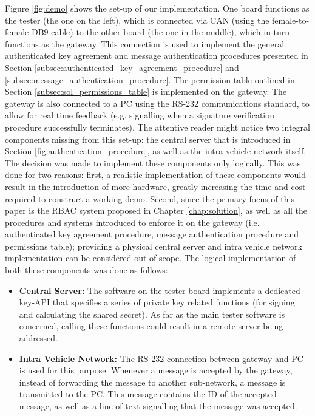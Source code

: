 Figure \ref{fig:demo} shows the set-up of our implementation. One board functions as the tester (the one on the left), which is connected via CAN (using the female-to-female DB9 cable) to the other board (the one in the middle), which in turn functions as the gateway. This connection is used to implement the general authenticated key agreement and message authentication procedures presented in Section \ref{subsec:authenticated_key_agreement_procedure} and \ref{subsec:message_authentication_procedure}. The permission table outlined in Section \ref{subsec:sol_permissions_table} is implemented on the gateway. The gateway is also connected to a PC using the RS-232 communications standard, to allow for real time feedback (e.g. signalling when a signature verification procedure successfully terminates). The attentive reader might notice two integral components missing from this set-up: the central server that is introduced in Section \ref{fig:authentication_procedure}, as well as the intra vehicle network itself. The decision was made to implement these components only logically. This was done for two reasons: first, a realistic implementation of these components would result in the introduction of more hardware, greatly increasing the time and cost required to construct a working demo. Second, since the primary focus of this paper is the RBAC system proposed in Chapter \ref{chap:solution}, as well as all the procedures and systems introduced to enforce it on the gateway (i.e. authenticated key agreement procedure, message authentication procedure and permissions table); providing a physical central server and intra vehicle network implementation can be considered out of scope. The logical implementation of both these components was done as follows:
\begin{itemize}
	\item \textbf{Central Server:} The software on the tester board implements a dedicated key-API that specifies a series of private key related functions (for signing and calculating the shared secret). As far as the main tester software is concerned, calling these functions could result in a remote server being addressed.
	
	\item \textbf{Intra Vehicle Network:} The RS-232 connection between gateway and PC is used for this purpose. Whenever a message is accepted by the gateway, instead of forwarding the message to another sub-network, a message is transmitted to the PC. This message contains the ID of the accepted message, as well as a line of text signalling that the message was accepted.
\end{itemize}


